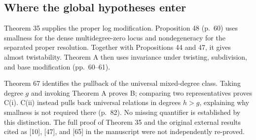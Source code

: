 \documentclass[10pt]{article}
\begin{document}
\subsection*{Where the global hypotheses enter}
Theorem 35 supplies the proper log modification. Proposition 48 (p. 60) uses smallness for the dense multidegree-zero locus and nondegeneracy for the separated proper resolution. Together with Propositions 44 and 47, it gives almost twistability. Theorem A then uses invariance under twisting, subdivision, and base modification (pp. 60–61).\par
Theorem 67 identifies the pullback of the universal mixed-degree class. Taking degree \(g\) and invoking Theorem A proves B; comparing two representatives proves C(i). C(ii) instead pulls back universal relations in degrees \(h>g\), explaining why smallness is not required there (p. 82). No missing quantifier is established by this distinction. The full proof of Theorem 35 and the original external results cited as [10], [47], and [65] in the manuscript were not independently re-proved.\par
\end{document}
